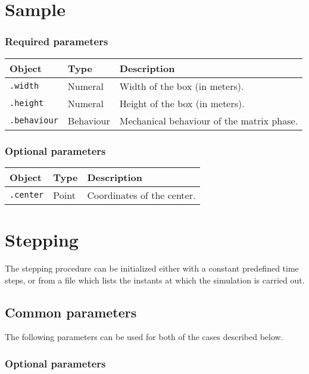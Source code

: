 \documentclass[10pt]{article}
\begin{document}
\section{Sample}

\subsubsection*{Required parameters}

\begin{tabularx}{\textwidth}{llX}
\hline 
Object & Type & Description \\ 
\hline 
\verb+.width+ & Numeral & Width of the box (in meters). \\ 
\verb+.height+ & Numeral & Height of the box (in meters). \\ 
\verb+.behaviour+ & Behaviour & Mechanical behaviour of the matrix phase. \\ 
\hline 
\end{tabularx}

\subsubsection*{Optional parameters}

\begin{tabularx}{\textwidth}{llX}
\hline 
Object & Type & Description \\ 
\hline 
\verb+.center+ & Point & Coordinates of the center. \\ 
\hline 
\end{tabularx} 

\section{Stepping}

The stepping procedure can be initialized either with a constant predefined time steps, or from a file which lists the instants at which the simulation is carried out.

\subsection{Common parameters}

The following parameters can be used for both of the cases described below.

\subsubsection*{Optional parameters}
\end{document}
